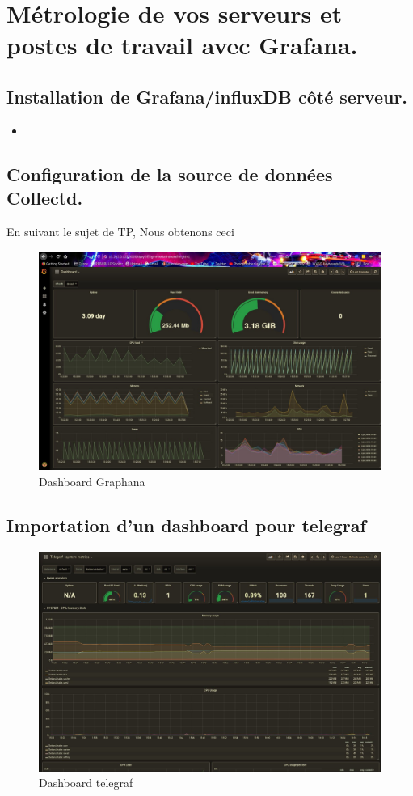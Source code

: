 \documentclass[10pt,a4paper]{article}
\newcommand{\insertcode}[2]{\begin{itemize}\item[]\end{itemize}}
\begin{document}
\newpage
\section{Métrologie de vos serveurs et postes de travail avec Grafana.}
\subsection{Installation de Grafana/influxDB côté serveur.}
\insertcode{commande/10.txt}{Installation/Utilisation de Docker}


\subsection{ Configuration de la source de données Collectd.}

En suivant le sujet de TP, 
Nous obtenons ceci 
  \begin{figure}[h!]
\centering
\includegraphics[scale=0.30]{screen/collectd.jpg}
\caption{Dashboard Graphana }
\label{fig:qos}
\end{figure}

\subsection{Importation d’un dashboard pour telegraf}
  \begin{figure}[h!]
\centering
\includegraphics[scale=0.30]{screen/telegraf.jpg}
\caption{Dashboard telegraf}
\label{fig:qos}
\end{figure}
\end{document}
